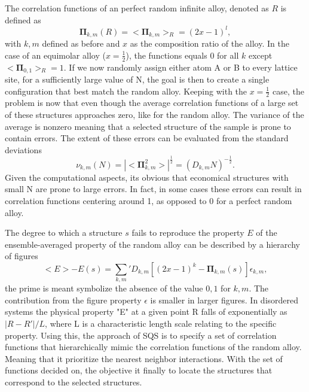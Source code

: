 The correlation functions of an perfect random infinite alloy, denoted as $R$ is defined as
\begin{equation}
    \boldsymbol{\Pi}_{k,m}(R) = <\boldsymbol{\Pi}_{k,m}>_R = (2x-1)^l ,
\end{equation}
with $k, m$ defined as before and $x$ as the composition ratio of the alloy. In the case of an equimolar alloy ($x=\frac{1}{2}$), the functions equals 0 for all $k$ except $<\boldsymbol{\Pi}_{0,1}>_R = 1$. If we now randomly assign either atom A or B to every lattice site, for a sufficiently large value of N, the goal is then to create a single configuration that best match the random alloy. Keeping with the $x=\frac{1}{2}$ case, the problem is now that even though the average correlation functions of a large set of these structures approaches zero, like for the random alloy. The variance of the average is nonzero meaning that a selected structure of the sample is prone to contain errors. The extent of these errors can be evaluated from the standard deviations
\begin{equation}
    \nu_{k,m}(N) = |<\boldsymbol{\Pi}^{2}_{k,m}>|^{\frac{1}{2}} = (D_{k,m}N)^{-\frac{1}{2}}.
\end{equation}
Given the computational aspects, its obvious that economical structures with small N are prone to large errors. In fact, in some cases these errors can result in correlation functions centering around 1, as opposed to 0 for a perfect random alloy.  

The degree to which a structure $s$ fails to reproduce the property $E$ of the ensemble-averaged property of the random alloy can be described by a hierarchy of figures
\begin{equation}
    <E> - E(s) = \sum_{k,m}' D_{k,m}[(2x-1)^k-\boldsymbol{\Pi}_{k,m}(s)]\epsilon_{k,m}, 
\end{equation}
the prime is meant symbolize the absence of the value $0,1$ for $k,m$. The contribution from the figure property $\epsilon$ is smaller in larger figures. In disordered systems the physical property "E" at a given point R falls of exponentially as $|R-R'|/L$, where L is a characteristic length scale relating to the specific property. Using this, the approach of SQS is to specify a set of correlation functions that hierarchically mimic the correlation functions of the random alloy. Meaning that it prioritize the nearest neighbor interactions. With the set of functions decided on, the objective it finally to locate the structures that correspond to the selected structures. 

